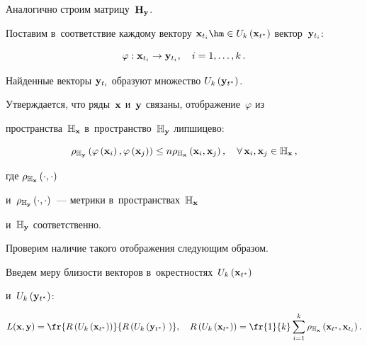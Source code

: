 Аналогично строим матрицу~$\mathbf{H}_{\mathbf{y}}$.

Поставим в~соответствие каждому вектору $\bx_{t_i}\hm \in 

U_{k}\left(\bx_{t^*}\right)$ вектор~$\by_{t_i}$:

$$

\varphi: \bx_{t_i} \to \by_{t_i}, \quad i = 1 , \ldots, k\,.

$$

Найденные векторы $\mathbf{y}_{t_i}$ образуют множество $U_{k}\left(\mathbf{y}_{t^*}\right)$.

Утверждается, что ряды~$\mathbf{x}$ и~$\mathbf{y}$ связаны, отображение~$\varphi$ из 

пространства~$\mathbb{H}_{\mathbf{x}}$ в~пространство~$\mathbb{H}_{\mathbf{y}}$ липшицево:



\noindent

$$

\rho_{\mathbb{H}_{\by}}\left(\varphi\left(\bx_i\right), 

\varphi\left(\bx_j\right)\right) \leq n  

\rho_{\mathbb{H}_{\bx}}\left(\bx_i, \bx_j\right), \quad \forall\, \bx_i, \bx_j \in 

\mathbb{H}_{\bx}\,,

$$

где $\rho_{\mathbb{H}_{\mathbf{x}}}\left(\cdot, \cdot\right)$

и~$\rho_{\mathbb{H}_{\mathbf{y}}}\left(\cdot, \cdot\right)$~--- метрики в~пространствах~$\mathbb{H}_{\mathbf{x}}$ 

и~$\mathbb{H}_{\mathbf{y}}$ соответственно.

Проверим наличие такого отображения следующим образом.

Введем меру близости векторов в~окрестностях~$U_k\left(\mathbf{x}_{t^*}\right)$ 

и~$U_k\left(\mathbf{y}_{t^*}\right)$:

\begin{equation}

\label{eq:measure_of_closeness}

L(\bx, \by) =

\fr{R\left(U_k\left(\bx_{t^*}\right)\right)}{R\left(U_k\left(\by_{t^*}\right)\

\right)}, \quad

R\left(U_k\left(\bx_{t^*}\right)\right) = \fr{1}{k}\sum\limits_{i = 

1}^{k}{\rho_{\mathbb{H}_{\bx}} \left( \bx_{t^*}, \bx_{t_i} \right)}\,.

\end{equation}

